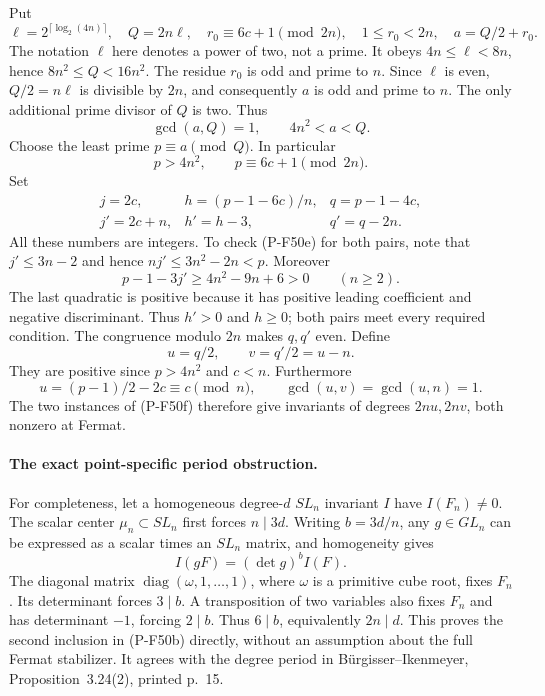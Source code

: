 \documentclass[11pt,a4paper]{article}
\begin{document}
Put
\[
 \ell=2^{\lceil\log_2(4n)\rceil},\quad Q=2n\ell,
 \quad r_0\equiv6c+1\pmod{2n},\quad 1\le r_0<2n,
 \quad a=Q/2+r_0.                                     \tag{P-F50k}
\]
The notation $\ell$ here denotes a power of two, not a
prime. It obeys $4n\le\ell<8n$, hence
$8n^2\le Q<16n^2$. The residue $r_0$ is odd and prime
to $n$. Since $\ell$ is even, $Q/2=n\ell$ is divisible
by $2n$, and consequently $a$ is odd and prime to $n$.
The only additional prime divisor of $Q$ is two.
Thus
\[
          \gcd(a,Q)=1,
                 \qquad4n^2<a<Q.                     \tag{P-F50l}
\]
Choose the least prime $p\equiv a\pmod Q$. In particular
\[
                 p>4n^2,
                 \qquad p\equiv6c+1\pmod{2n}.         \tag{P-F50m}
\]
Set
\[
 \begin{array}{lll}
 j=2c,&h=(p-1-6c)/n,&q=p-1-4c,\\
 j'=2c+n,&h'=h-3,&q'=q-2n.
 \end{array}                                           \tag{P-F50n}
\]
All these numbers are integers. To check (P-F50e) for
both pairs, note that $j'\le3n-2$ and hence
$nj'\le3n^2-2n<p$. Moreover
\[
 p-1-3j'\ge4n^2-9n+6>0\qquad(n\ge2).
\]
The last quadratic is positive because it has positive
leading coefficient and negative discriminant. Thus
$h'>0$ and $h\ge0$; both pairs meet every required
condition. The congruence modulo $2n$ makes $q,q'$ even.
Define
\[
                      u=q/2,\qquad v=q'/2=u-n.
                                                        \tag{P-F50o}
\]
They are positive since $p>4n^2$ and $c<n$.
Furthermore
\[
      u=(p-1)/2-2c\equiv c\pmod n,
          \qquad \gcd(u,v)=\gcd(u,n)=1.                \tag{P-F50p}
\]
The two instances of (P-F50f) therefore give invariants
of degrees $2nu,2nv$, both nonzero at Fermat.

\paragraph{The exact point-specific period obstruction.}
For completeness, let a homogeneous degree-$d$ $SL_n$
invariant $I$ have $I(F_n)\ne0$. The scalar center
$\mu_n\subset SL_n$ first forces $n\mid3d$.
Writing $b=3d/n$, any $g\in GL_n$ can be expressed as
a scalar times an $SL_n$ matrix, and homogeneity gives
\[
                         I(gF)=(\det g)^b I(F).
                                                        \tag{P-F50q}
\]
The diagonal matrix $\operatorname{diag}(\omega,1,\ldots,1)$,
where $\omega$ is a primitive cube root, fixes $F_n$.
Its determinant forces $3\mid b$. A transposition of
two variables also fixes $F_n$ and has determinant
$-1$, forcing $2\mid b$. Thus $6\mid b$, equivalently
$2n\mid d$. This proves the second inclusion in
(P-F50b) directly, without an assumption about the
full Fermat stabilizer. It agrees with the degree
period in B\"urgisser--Ikenmeyer, Proposition~3.24(2),
printed p.~15.
\end{document}
